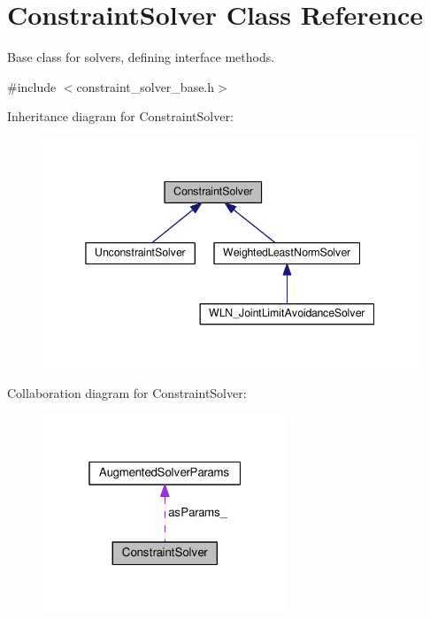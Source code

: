 \hypertarget{classConstraintSolver}{\section{Constraint\-Solver Class Reference}
\label{classConstraintSolver}
}


Base class for solvers, defining interface methods.  




{\ttfamily \#include $<$constraint\-\_\-solver\-\_\-base.\-h$>$}



Inheritance diagram for Constraint\-Solver\-:
\nopagebreak
\begin{figure}[H]
\begin{center}
\leavevmode
\includegraphics[width=345pt]{classConstraintSolver__inherit__graph}
\end{center}
\end{figure}


Collaboration diagram for Constraint\-Solver\-:
\nopagebreak
\begin{figure}[H]
\begin{center}
\leavevmode
\includegraphics[width=208pt]{classConstraintSolver__coll__graph}
\end{center}
\end{figure}
